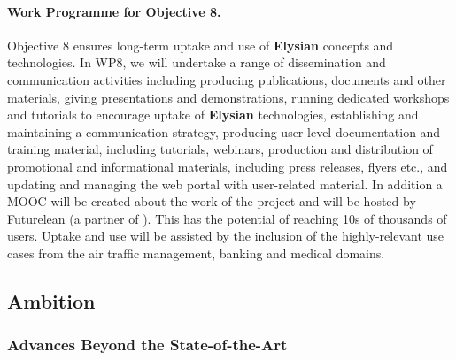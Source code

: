 \documentclass[a4paper,11pt]{article}
\newcommand{\project}[1]{\textbf{#1}\xspace}
\newcommand{\SECURITY}{\project{Elysian}}
\newcommand{\TheProject}{\SECURITY}
\begin{document}
\paragraph{Work Programme for Objective 8.}

Objective 8 ensures long-term uptake and use of \TheProject{} concepts and technologies. In WP8, we will undertake a range of dissemination and communication activities including producing publications, documents and other materials, giving presentations and demonstrations, running dedicated workshops and tutorials to encourage uptake of \TheProject{} technologies, establishing and maintaining a communication strategy, producing user-level documentation and training material, including tutorials, webinars, production and distribution of promotional and informational materials, including press releases, flyers etc., and updating and managing the web portal with user-related material.  In addition a MOOC will be created about the work of the project and will be hosted by Futurelean (a partner of \UODshort{}). This has the potential of reaching 10s of thousands of users.  Uptake and use will be assisted by the inclusion of the highly-relevant use cases from the air traffic management, %
banking and medical domains.


\subsection{Ambition}


\subsubsection{Advances Beyond the State-of-the-Art}
\label{sec:novelty}



\end{document}
